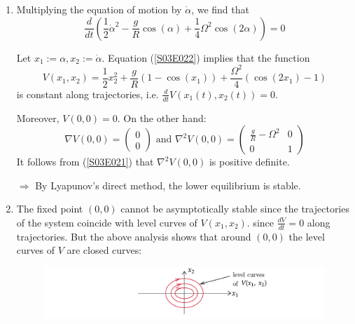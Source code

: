 \documentclass[twoside,10pt,a4paper]{article}
\begin{document}
\begin{enumerate}[label=(\alph*)]
\item Multiplying the equation of motion by $\dot{\alpha}$, we find that
\begin{equation}\label{S03E022}
	\frac{d}{dt} \left( \frac{1}{2}\dot{\alpha}^2 - \frac{g}{R}\cos(\alpha) + \frac{1}{4}\Omega^2 \cos(2\alpha) \right) = 0
\end{equation}

Let $x_1 := \alpha, x_2 := \dot{\alpha}$. Equation (\ref{S03E022}) implies that the function
\begin{equation*}
	V(x_1,x_2) = \frac{1}{2}x_2^2 + \frac{g}{R}(1 - \cos(x_1)) + \frac{\Omega^2}{4}(\cos(2x_1) - 1)
\end{equation*}
is constant along trajectories, i.e. $\frac{d}{dt}V(x_1(t),x_2(t))=0$.

Moreover, $V(0,0)=0$. On the other hand:
\begin{equation*}
	\nabla V(0,0) = \begin{pmatrix}
	0 \\0
	\end{pmatrix}
	\text{ and } \nabla^2V(0,0) = \begin{pmatrix}
		\displaystyle \frac{g}{R} - \Omega^2 & 0 \\
		0 & 1
	\end{pmatrix}
\end{equation*}
It follows from (\ref{S03E021}) that $\nabla^2V(0,0)$ is positive definite.

$\Longrightarrow$ By Lyapunov's direct method, the lower equilibrium is stable.


\item The fixed point $(0,0)$ cannot be asymptotically stable since the trajectories of the system coincide with level curves of $V(x_1,x_2)$. since $\frac{dV}{dt}=0$ along trajectories. But the above analysis shows that around $(0,0)$ the level curves of $V$ are closed curves:

\begin{figure}[H]
	\centering
	\includegraphics[scale=0.9]{Graphics/S04D01.pdf}
\end{figure}

\end{enumerate}
\end{document}

